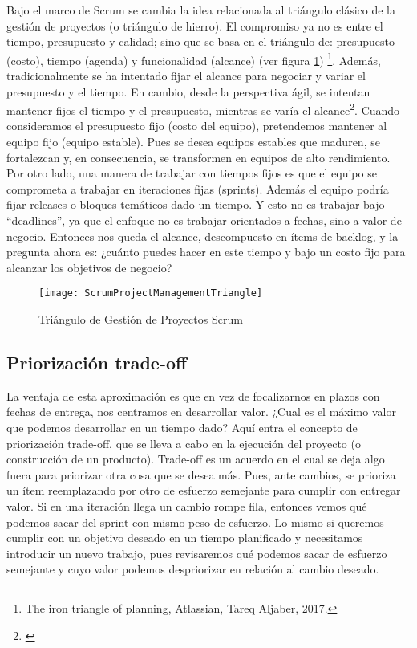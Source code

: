 Bajo el marco de Scrum se cambia la idea relacionada al triángulo clásico de la gestión de proyectos (o triángulo de hierro). El compromiso ya no es entre el tiempo, presupuesto y calidad; sino que se basa en el triángulo de: presupuesto (costo), tiempo (agenda) y funcionalidad (alcance) (ver figura \ref{fig:ScrumProjectManagementTriangle}) \footnote{The iron triangle of planning, Atlassian, Tareq Aljaber, 2017.}. Además, tradicionalmente se ha intentado fijar el alcance para negociar y variar el presupuesto y el tiempo. En cambio, desde la perspectiva ágil, se intentan mantener fijos el tiempo y el presupuesto, mientras se varía el alcance\footnote{\cite{Martin-Alaimo-2014}}. Cuando consideramos el presupuesto fijo (costo del equipo), pretendemos mantener al equipo fijo (equipo estable). Pues se desea equipos estables que maduren, se fortalezcan y, en consecuencia, se transformen en equipos de alto rendimiento. Por otro lado, una manera de trabajar con tiempos fijos es que el equipo se comprometa a trabajar en iteraciones fijas (sprints). Además el equipo podría fijar releases o bloques temáticos dado un tiempo. Y esto no es trabajar bajo “deadlines”, ya que el enfoque no es trabajar orientados a fechas, sino a valor de negocio. Entonces nos queda el alcance, descompuesto en ítems de backlog, y la pregunta ahora es: ¿cuánto puedes hacer en este tiempo y bajo un costo fijo para alcanzar los objetivos de negocio?

\begin{figure}[h]
  \centering
  \texttt{[image: ScrumProjectManagementTriangle]}
  \caption{Triángulo de Gestión de Proyectos Scrum}
  \centering
  \label{fig:ScrumProjectManagementTriangle} %
\end{figure}

\subsection{Priorización trade-off}

La ventaja de esta aproximación es que en vez de focalizarnos en plazos con fechas de entrega, nos centramos en desarrollar valor. ¿Cual es el máximo valor que podemos desarrollar en un tiempo dado? Aquí entra el concepto de priorización trade-off, que se lleva a cabo en la ejecución del proyecto (o construcción de un producto). Trade-off es un acuerdo en el cual se deja algo fuera para priorizar otra cosa que se desea más. Pues, ante cambios, se prioriza un ítem reemplazando por otro de esfuerzo semejante para cumplir con entregar valor. Si en una iteración llega un cambio rompe fila, entonces vemos qué podemos sacar del sprint con mismo peso de esfuerzo. Lo mismo si queremos cumplir con un objetivo deseado en un tiempo planificado y necesitamos introducir un nuevo trabajo, pues revisaremos qué podemos sacar de esfuerzo semejante y cuyo valor podemos despriorizar en relación al cambio deseado.

